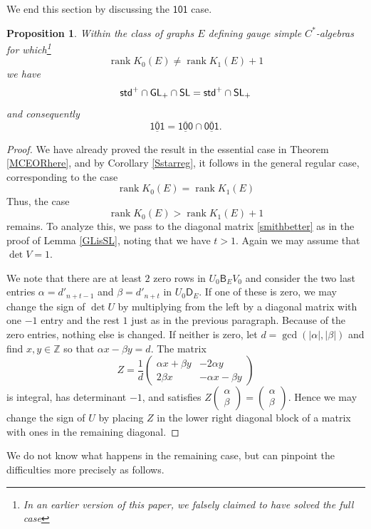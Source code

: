 \documentclass[12pt]{amsbook}%
\newcommand{\BB}{\mathsf B}
\newcommand{\DD}{\mathsf D}
\newtheorem{propo}[theor]{Proposition}
\theoremstyle{defin}
\theoremstyle{remark}
\numberwithin{equation}{chapter}
\numberwithin{theor}{section}
\newcommand{\ZZ}{\mathbb{Z}}
\newcommand{\xyz}[1]{\mbox{$\mathsf{#1}$}}
\newcommand{\xyzrel}[1]{\mbox{$\overline{\underline{\mathsf{ #1}}}$}}
\newcommand{\standardp}{\mathsf{std}^+}
\newcommand{\SL}{{\sf SL}}
\newcommand{\SLp}{\mbox{${\sf SL}_+$}}
\newcommand{\GLp}{\mbox{${\sf GL}_+$}}
\begin{document}
We end this section by discussing the \xyz{101} case.

\begin{propo}\label{notbadcase}
Within the class of  graphs $E$ defining gauge simple $C^*$-algebras for which\footnote{In an earlier version of this paper, we falsely claimed to have solved the full case}
\[
\operatorname{rank} K_0(E)\not =\operatorname{rank} K_1(E)+1
\]
we have
\[
\standardp\cap \GLp\cap \SL= \standardp\cap \SLp
\]
and consequently
\[
\xyzrel{101}=\xyzrel{100}\cap\xyzrel{001}.
\]
\end{propo}
\begin{proof}
We have already proved the result in the essential case in Theorem \ref{MCEORhere}, and by Corollary \ref{Sstarreg},  it follows in the general regular case, corresponding to the case 
\[
\operatorname{rank} K_0(E) =\operatorname{rank} K_1(E)
\]
Thus, the case 
\[
\operatorname{rank} K_0(E) >\operatorname{rank} K_1(E)+1
\]
remains. To analyze this, we pass to the diagonal matrix \eqref{smithbetter} as in the proof of Lemma \ref{GLisSL}, noting that we have $t>1$. Again we may assume that $\det V=1$.

 We note that there are at least $2$ zero rows in $U_0\BB_E V_0$ and consider the two last entries $\alpha=d'_{n+t-1}$ and $\beta=d'_{n+t}$ in $U_0\DD_E$. If one of these is zero, we may change the sign of $\det U$ by multiplying from the left by a diagonal matrix with one $-1$ entry and the rest $1$ just as in the previous paragraph. Because of the zero entries, nothing else is changed. If neither is zero, let $d=\gcd(|\alpha|,|\beta|)$ and find $x,y\in \ZZ$ so that $\alpha x-\beta y=d$. The matrix
\[
Z=\frac1d\begin{pmatrix}\alpha x+\beta y&-2\alpha y\\2\beta x&-\alpha x-\beta y\end{pmatrix}
\]
is integral, has determinant $-1$, and satisfies $Z\left(\begin{smallmatrix}\alpha \\\beta\end{smallmatrix}\right)=\left(\begin{smallmatrix}\alpha \\\beta\end{smallmatrix}\right)$. Hence we may change the sign of $U$ by placing $Z$ in the lower right diagonal block of a matrix with ones in the remaining diagonal.
\end{proof}

We do not know what happens in the remaining case, but can pinpoint the difficulties more precisely as follows. 
\end{document}
